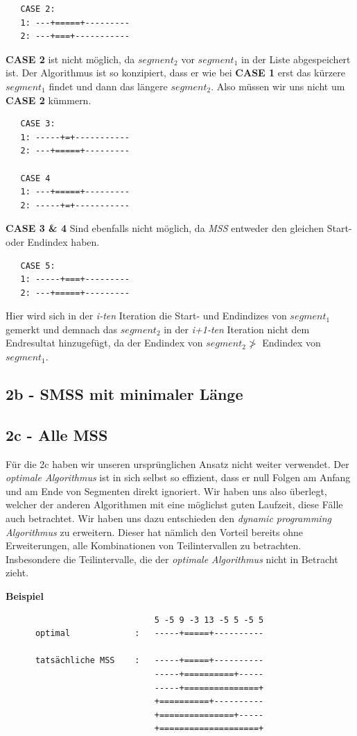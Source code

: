 \documentclass[10pt]{article}
\begin{document}
\begin{verbatim}
   CASE 2:
   1: ---+=====+---------
   2: ---+===+-----------
\end{verbatim}
\textbf{CASE 2} ist nicht möglich, da $segment_{2}$ vor $segment_{1}$ in der Liste abgespeichert ist.
Der Algorithmus ist so konzipiert, dass er wie bei \textbf{CASE 1} erst das kürzere $segment_{1}$ findet und dann das
längere $segment_{2}$. Also müssen wir uns nicht um \textbf{CASE 2} kümmern.
\begin{verbatim}
   CASE 3:
   1: -----+=+-----------
   2: ---+=====+---------

   CASE 4
   1: ---+=====+---------
   2: -----+=+-----------
\end{verbatim}
\textbf{CASE 3 \& 4} Sind ebenfalls nicht möglich, da \textit{MSS} entweder den gleichen Start- oder Endindex haben.

\begin{verbatim} 
   CASE 5:
   1: -----+===+---------
   2: ---+=====+---------
\end{verbatim}
Hier wird sich in der \textit{i-ten} Iteration die Start- und Endindizes von $segment_{1}$ gemerkt
und demnach das $segment_{2}$ in der \textit{i+1-ten} Iteration nicht dem Endresultat hinzugefügt,
da der Endindex von $segment_2 \not >$  Endindex von $segment_1$.
\subsection{2b - SMSS mit minimaler Länge}\label{sec:2b}
\lipsum[1]
\subsection{2c - Alle MSS}\label{sec:2c}

Für die 2c haben wir unseren ursprünglichen Ansatz nicht weiter verwendet. Der \textit{optimale Algorithmus} ist in sich selbst so effizient,
dass er null Folgen am Anfang und am Ende von Segmenten direkt ignoriert. Wir haben uns also überlegt, welcher der anderen 
Algorithmen mit eine möglichst guten Laufzeit, diese Fälle auch betrachtet. Wir haben uns dazu entschieden den \textit{dynamic programming Algorithmus} zu erweitern. Dieser hat nämlich den Vorteil
bereits ohne Erweiterungen, alle Kombinationen von Teilintervallen zu betrachten. Insbesondere die Teilintervalle,
die der \textit{optimale Algorithmus} nicht in Betracht zieht.

\textbf{Beispiel}

\begin{verbatim}
                              5 -5 9 -3 13 -5 5 -5 5
      optimal             :   -----+=====+----------

      tatsächliche MSS    :   -----+=====+----------
                              -----+==========+-----
                              -----+===============+
                              +==========+----------
                              +===============+-----
                              +====================+
\end{verbatim}
\end{document}
